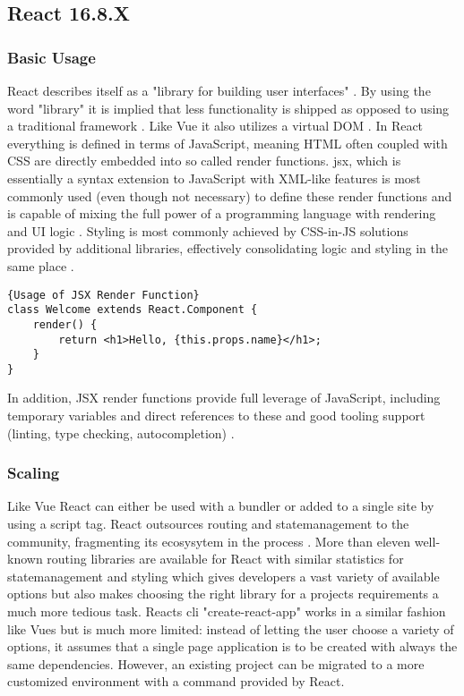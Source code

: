 
\subsection{React 16.8.X}

\subsubsection{Basic Usage}
React describes itself as a "library for building user interfaces" \cite[p.~2]{LearningReactBanks:book}. By using the word "library" it is implied that less functionality is shipped as opposed to using a traditional framework \cite[p.~2]{LearningReactBanks:book}. Like Vue it also utilizes a virtual DOM \cite[p.~81]{LearningReactBanks:book}. In React everything is defined in terms of JavaScript, meaning HTML often coupled with CSS are directly embedded into so called render functions. \acrfull{jsx}, which is essentially a syntax extension to JavaScript with XML-like features \cite{ReactJSX:online} is most commonly used (even though not necessary) to define these render functions and is capable of mixing the full power of a programming language with rendering and UI logic \cite{ComparisonVue:online}. Styling is most commonly achieved by CSS-in-JS solutions provided by additional libraries, effectively consolidating logic and styling in the same place \cite{islam2017reactjs:article}. \newline

\begin{lstlisting}[caption=Usage of JSX Render Function, captionpos=b, style=htmlcssjs]{Usage of JSX Render Function}
class Welcome extends React.Component {
    render() {
        return <h1>Hello, {this.props.name}</h1>;
    }
}
\end{lstlisting}

In addition, JSX render functions provide full leverage of JavaScript, including temporary variables and direct references to these and good tooling support (linting, type checking, autocompletion) \cite{ComparisonVue:online, ReactJSX:online}.

\subsubsection{Scaling}
Like Vue React can either be used with a bundler or added to a single site by using a script tag. React outsources \gls{routing} and \gls{statemanagement} to the community, fragmenting its ecosysytem in the process \cite{ComparisonVue:online}. More than eleven well-known routing libraries are available for React with similar statistics for \gls{statemanagement} and styling which gives developers a vast variety of available options but also makes choosing the right library for a projects requirements a much more tedious task. Reacts cli "create-react-app" works in a similar fashion like Vues but is much more limited: instead of letting the user choose a variety of options, it assumes that a single page application is to be created with always the same dependencies. However, an existing project can be migrated to a more customized environment with a command provided by React.


